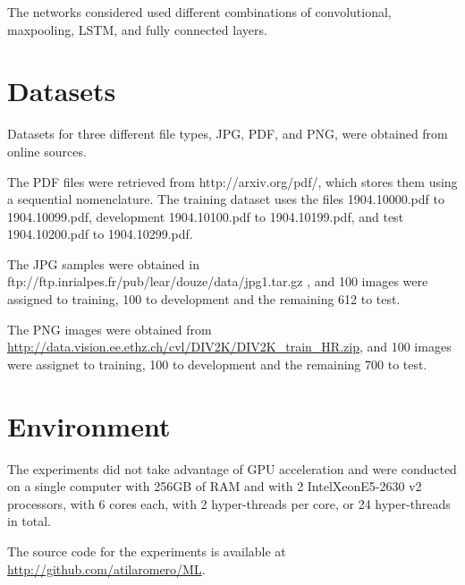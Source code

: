 The networks considered used different combinations of convolutional, maxpooling, LSTM, and fully connected layers.


\section{Datasets}

Datasets for three different file types, JPG, PDF, and PNG, were obtained from online sources.

The PDF files were retrieved from http://arxiv.org/pdf/, which stores them using a sequential nomenclature. The training dataset uses the files 1904.10000.pdf to 1904.10099.pdf, development 1904.10100.pdf to 1904.10199.pdf, and test 1904.10200.pdf to 1904.10299.pdf. 

The JPG samples were obtained in ftp://ftp.inrialpes.fr/pub/lear/douze/data/jpg1.tar.gz , and 100 images were assigned to training, 100 to development and the remaining 612 to test.

The PNG images were obtained from \url{http://data.vision.ee.ethz.ch/cvl/DIV2K/DIV2K_train_HR.zip}, and 100 images were assignet to training, 100 to development and the remaining 700 to test.


\section{Environment}
The experiments did not take advantage of GPU acceleration and were  conducted on a single computer with 256GB of RAM and with 2 Intel\textregistered Xeon\textregistered E5-2630 v2 processors, with 6 cores each, with 2 hyper-threads per core, or 24 hyper-threads in total. 

The source code for the experiments is available at \url{http://github.com/atilaromero/ML}.

